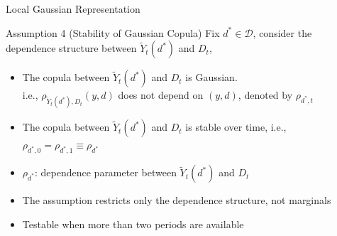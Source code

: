 \documentclass[aspectratio=1610, 9pt]{beamer}
\begin{document}
\begin{frame}{Local Gaussian Representation}

    
\vspace{0.4cm}

\begin{block}{Assumption 4 (Stability of Gaussian Copula)} Fix $d^*\in \mathcal{D}$, consider the dependence structure between $\tilde{Y}_t(d^*) $ and $D_t$,
 \vspace{0.1cm}

\begin{itemize}
    \item[(i)] The copula between $\tilde{Y}_t(d^*) $ and $D_t$ is Gaussian. \\
        \vspace{0.1cm}
    i.e., $\rho_{\tilde{Y}_t(d^*),D_t}(y,d)$ does not depend on $(y,d)$, denoted by $\rho_{d^*,t}$
    \vspace{0.2cm}
    \item[(ii)] The copula between $\tilde{Y}_t(d^*) $ and $D_t$ is stable over time, i.e., $\rho_{d^*,0}=\rho_{d^*,1} \equiv \rho_{d^*}$

\end{itemize}
     
\end{block}

\vspace{0.6cm}

\begin{itemize}
    \item $\rho_{d^*} $: dependence parameter between $\tilde{Y}_t(d^*) $ and $D_t$  
    \item The assumption restricts only the dependence structure, not marginals
    \item Testable when more than two periods are available
\end{itemize}

\end{frame}
\end{document}
